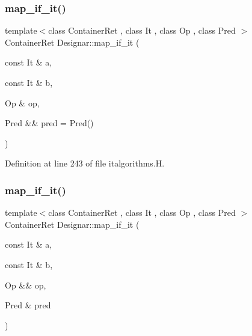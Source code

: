 \mbox{\label{namespace_designar_afebc876d3ceb8615462f21c3ed15eb0c}} 
\subsubsection{\texorpdfstring{map\+\_\+if\+\_\+it()}{map\_if\_it()}\hspace{0.1cm}{\footnotesize\ttfamily [2/4]}}
{\footnotesize\ttfamily template$<$class Container\+Ret , class It , class Op , class Pred $>$ \\
Container\+Ret Designar\+::map\+\_\+if\+\_\+it (\begin{DoxyParamCaption}\item[{const It \&}]{a,  }\item[{const It \&}]{b,  }\item[{Op \&}]{op,  }\item[{Pred \&\&}]{pred = {\ttfamily Pred()} }\end{DoxyParamCaption})}



Definition at line 243 of file italgorithms.\+H.

\mbox{\label{namespace_designar_a5db9dd044c541c52c021da1e1af12032}} 
\subsubsection{\texorpdfstring{map\+\_\+if\+\_\+it()}{map\_if\_it()}\hspace{0.1cm}{\footnotesize\ttfamily [3/4]}}
{\footnotesize\ttfamily template$<$class Container\+Ret , class It , class Op , class Pred $>$ \\
Container\+Ret Designar\+::map\+\_\+if\+\_\+it (\begin{DoxyParamCaption}\item[{const It \&}]{a,  }\item[{const It \&}]{b,  }\item[{Op \&\&}]{op,  }\item[{Pred \&}]{pred }\end{DoxyParamCaption})}



